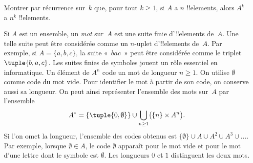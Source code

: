 \documentclass[../../../include/open-logic-section]{subfiles}
\begin{document}
\begin{prob}
Montrer par récurrence sur~$k$ que, pour tout $k \ge 1$,
si $A$ a $n$ !!{element}s, alors $A^k$ a $n^k$ !!{element}s.
\end{prob}

\begin{ex}
Si $A$ est un ensemble, un \emph{mot} sur~$A$ est une suite
finie d'!!{element}s de~$A$. Une telle suite peut être considérée
comme un $n$-uplet d'!!{element}s de~$A$. Par exemple, si
$A = \{a, b, c\}$, la suite «~$bac$~» peut être considérée
comme le triplet~$\tuple{b, a, c}$.
Les suites finies de symboles jouent un rôle essentiel en informatique.
Un élément de $A^n$ code un mot de longueur $n\ge 1$. On utilise
$\emptyset$ comme code du mot vide. Pour identifier le mot à partir
de son code, on conserve aussi sa longueur. On peut ainsi représenter
l'ensemble des mots sur~$A$ par l'ensemble
\[
A^* = \{\tuple{0,\emptyset}\}
      \cup \bigcup_{n\ge 1} \bigl(\{n\}\times A^n\bigr).
\]
Si l'on omet la longueur, l'ensemble des codes obtenus est
$\{\emptyset\} \cup A \cup A^2 \cup A^3 \cup \dots$.
Par exemple, lorsque $\emptyset\in A$, le code $\emptyset$
apparaît pour le mot vide et pour le mot d'une lettre
dont le symbole est $\emptyset$. Les longueurs $0$ et $1$
distinguent les deux mots.
%
%
\end{ex}
\end{document}
